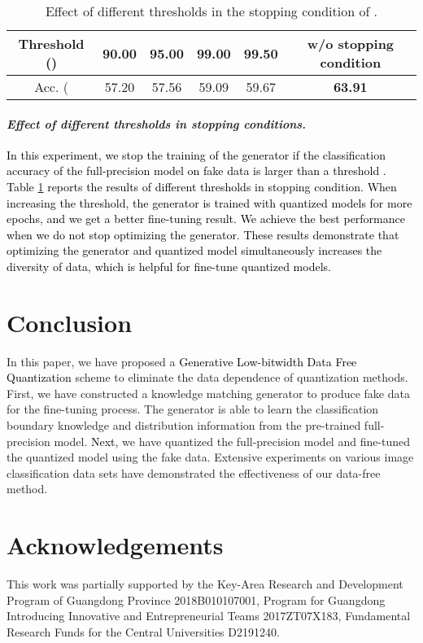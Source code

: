\documentclass[runningheads]{llncs}
\def\mytitle{\textcolor{black}{Generative Low-bitwidth Data Free Quantization }}
\def\lhk{\textcolor{black}}
\def\new{\textcolor{black}}
\begin{document}
\begin{table}[t]
\tabcolsep=8pt
\begin{center}
\caption{Effect of different thresholds in the stopping condition of .}
\label{tb:early_stop_G}
\begin{tabular}{cccccc}
\hline
Threshold  () & 90.00 & 95.00 & 99.00 & 99.50 & w/o stopping condition \\ 
\hline
Acc. ( & 57.20 & 57.56 & 59.09 & 59.67 & \textbf{63.91} \\
\hline
\end{tabular}
\end{center}
\end{table}
\paragraph{\emph{\textbf{Effect of different thresholds in stopping conditions.}}}


\lhk{In this experiment, we stop the training of the generator if the classification accuracy of the full-precision model on fake data is larger than a threshold . Table \ref{tb:early_stop_G} reports the results of different thresholds  in stopping condition. When increasing the threshold, the generator is trained with quantized models for more epochs, and we get a better fine-tuning result. \new{We} achieve the best performance when we do not stop optimizing the generator. These results demonstrate that optimizing the generator and quantized model simultaneously increases the diversity of data, which is helpful for fine-tune quantized models.}


\section{Conclusion}
In this paper, we have proposed a \mytitle scheme to eliminate the data dependence of quantization methods. 
First, we have constructed a knowledge matching generator to produce fake data for the fine-tuning process. 
The generator is able to learn the classification boundary knowledge and distribution information from the pre-trained full-precision model.
\new{Next,} we have quantized the full-precision model and fine-tuned the quantized model using the fake data.
Extensive experiments on various image classification data sets have demonstrated the effectiveness of our data-free method.

\section*{Acknowledgements}
This work was partially supported by the Key-Area Research and Development Program of Guangdong Province 2018B010107001, Program for Guangdong Introducing Innovative and Entrepreneurial Teams 2017ZT07X183, Fundamental Research Funds for the Central Universities D2191240.
\end{document}
